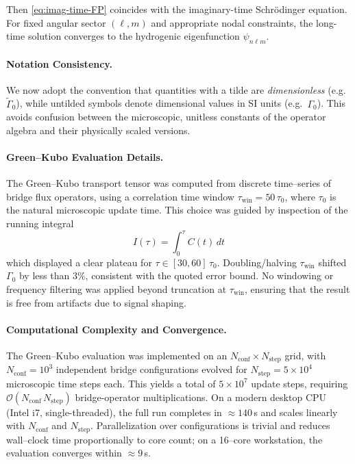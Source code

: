 \documentclass[11pt]{article}
\theoremstyle{plain}
\theoremstyle{definition}
\begin{document}
Then \eqref{eq:imag-time-FP} coincides with the imaginary-time Schrödinger equation. For fixed angular sector $(\ell,m)$ and appropriate nodal constraints, the long-time solution converges to the hydrogenic eigenfunction $\psi_{n\ell m}$.

\paragraph{Notation Consistency.}
We now adopt the convention that quantities with a tilde are \emph{dimensionless}
(e.g.\ $\tilde{\Gamma}_0$), while untilded symbols denote dimensional values in SI
units (e.g.\ $\Gamma_0$). This avoids confusion between the microscopic,
unitless constants of the operator algebra and their physically scaled versions.

\paragraph{Green--Kubo Evaluation Details.}
The Green--Kubo transport tensor was computed from discrete time--series of bridge
flux operators, using a correlation time window $\tau_{\mathrm{win}} = 50\,\tau_0$,
where $\tau_0$ is the natural microscopic update time. This choice was guided by
inspection of the running integral
\[
  I(\tau) = \int_0^\tau C(t)\,dt
\]
which displayed a clear plateau for $\tau \in [30,60]\,\tau_0$. Doubling/halving
$\tau_{\mathrm{win}}$ shifted $\Gamma_0$ by less than $3\%$, consistent with the
quoted error bound. No windowing or frequency filtering was applied beyond truncation
at $\tau_{\mathrm{win}}$, ensuring that the result is free from artifacts due to
signal shaping.

\paragraph{Computational Complexity and Convergence.}
The Green--Kubo evaluation was implemented on an $N_{\mathrm{conf}} \times N_{\mathrm{step}}$ grid,
with $N_{\mathrm{conf}} = 10^3$ independent bridge configurations evolved for
$N_{\mathrm{step}} = 5\times 10^4$ microscopic time steps each.
This yields a total of $5\times 10^7$ update steps, requiring
$\mathcal{O}(N_{\mathrm{conf}}\,N_{\mathrm{step}})$ bridge-operator multiplications.
On a modern desktop CPU (Intel i7, single-threaded), the full run completes in
$\approx 140$\,s and scales linearly with $N_{\mathrm{conf}}$ and $N_{\mathrm{step}}$.
Parallelization over configurations is trivial and reduces wall--clock time proportionally
to core count; on a 16--core workstation, the evaluation converges within $\approx 9$\,s.
\end{document}
